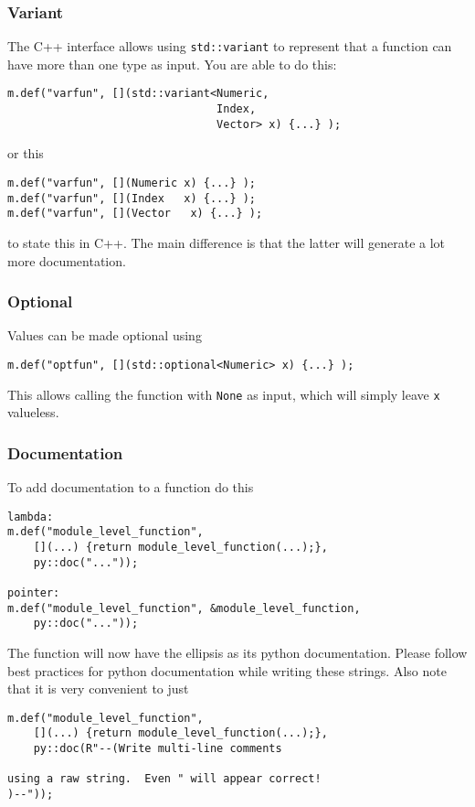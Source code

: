 \subsubsection{Variant}
The C++ interface allows using \verb|std::variant| to represent that a function can have more than one type as input.
You are able to do this:
\begin{verbatim}
m.def("varfun", [](std::variant<Numeric,
                                Index,
                                Vector> x) {...} );
\end{verbatim}
or this
\begin{verbatim}
m.def("varfun", [](Numeric x) {...} );
m.def("varfun", [](Index   x) {...} );
m.def("varfun", [](Vector   x) {...} );
\end{verbatim}
to state this in C++.  The main difference is that the latter will generate a lot more documentation.
\subsubsection{Optional}
Values can be made optional using
\begin{verbatim}
m.def("optfun", [](std::optional<Numeric> x) {...} );
\end{verbatim}
This allows calling the function with \verb|None| as input, which will simply leave \verb|x| valueless.
\subsubsection{Documentation}
To add documentation to a function do this
\begin{verbatim}
lambda:
m.def("module_level_function",
    [](...) {return module_level_function(...);},
    py::doc("..."));

pointer:
m.def("module_level_function", &module_level_function,
    py::doc("..."));
\end{verbatim}
The function will now have the ellipsis as its python documentation.  Please follow best practices for python documentation while writing these strings.  Also
note that it is very convenient to just
\begin{verbatim}
m.def("module_level_function",
    [](...) {return module_level_function(...);},
    py::doc(R"--(Write multi-line comments

using a raw string.  Even " will appear correct!
)--"));
\end{verbatim}
